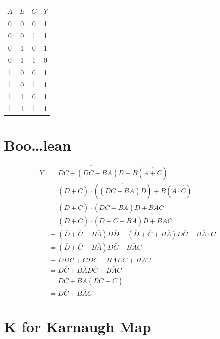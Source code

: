 \documentclass{article}
\begin{document}
\begin{tabular}{||c|c|c||c||}
    \hline
    \(A\) & \(B\) & \(C\) & \(Y\) \\
    \hline
    0 & 0 & 0 & 1 \\
    0 & 0 & 1 & 1 \\
    0 & 1 & 0 & 1 \\
    0 & 1 & 1 & 0 \\
    1 & 0 & 0 & 1 \\
    1 & 0 & 1 & 1 \\
    1 & 1 & 0 & 1 \\
    1 & 1 & 1 & 1 \\
    \hline
\end{tabular}

\newpage
\section{Boo\ldots lean}

\begin{align}
    Y &= \overline{DC + \overline{(\overline{DC} + B\overline{A}) D}} + B (\overline{A + \overline{C}}) \\
    &= (\overline{D} + \overline{C}) \cdot (\overline{\overline{(\overline{DC} + B\overline{A}) D}}) + B (\overline{A} \cdot \overline{\overline{C}}) \\
    &= (\overline{D} + \overline{C}) \cdot (\overline{DC} + B\overline{A}) D + B \overline{A} C \\
    &= (\overline{D} + \overline{C}) \cdot (\overline{D} + \overline{C} + B \overline{A}) D + B \overline{A} C \\
    &= (\overline{D} + \overline{C} + B\overline{A}) D \overline{D} +(\overline{D} + \overline{C} + B\overline{A}) D \overline{C} + B \overline{A} \cdot C \\
    &= (\overline{D} + \overline{C} + B \overline{A}) D \overline{C} + B \overline{A} C \\
    &= \overline{D} D \overline{C} + \overline{C} D \overline{C} + B \overline{A} D \overline{C} + B \overline{A} C \\
    &= D \overline{C} + B \overline{A} D \overline{C} + B \overline{A} C \\
    &= D \overline{C} + B \overline{A} (D \overline{C} + C) \\
    &= D \overline{C} + B \overline{A} C
\end{align}

\newpage
\section{K for Karnaugh Map}
\end{document}
